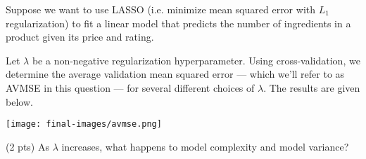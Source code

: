 \documentclass[twoside,12pt]{article}
\begin{document}
\begin{probset}
\begin{prob}[(5 pts)]
\begin{subprobset}
\begin{subprob}
\biginlineresponsebox[2in]{}

\end{subprob}

\end{subprobset}

\end{prob}








\newpage

\begin{prob}[(8 pts)]

Suppose we want to use LASSO (i.e. minimize mean squared error with $L_1$ regularization) to fit a linear model that predicts the number of ingredients in a product given its price and rating.

Let $\lambda$ be a non-negative regularization hyperparameter. Using cross-validation, we determine the average validation mean squared error --- which we'll refer to as AVMSE in this question --- for several different choices of $\lambda$. The results are given below.

\begin{center}

\texttt{[image: final-images/avmse.png]}

\end{center}

\begin{subprobset}

\begin{subprob}(2 pts) As $\lambda$ increases, what happens to model complexity and model variance?




\end{subprob}
\end{subprobset}
\end{prob}
\end{probset}
\end{document}
